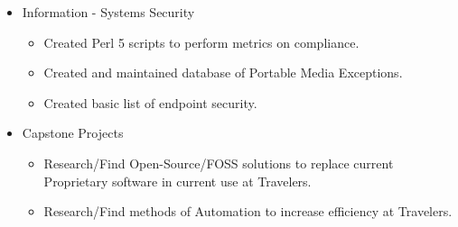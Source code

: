 \begin{cvparagraph}
\begin{itemize}
   \item Information - Systems Security
   \begin{itemize}
      \item Created Perl 5 scripts to perform metrics on compliance.
      \item Created and maintained database of Portable Media Exceptions.
      \item Created basic list of endpoint security.
   \end{itemize}
   
   \item[] \hspace{-0.4cm} Capstone Projects
   \begin{itemize}
      \item Research/Find Open-Source/FOSS solutions to replace current Proprietary
            software in current use at Travelers.
      \item Research/Find methods of Automation to increase efficiency at Travelers.
   \end{itemize}

\end{itemize}

\end{cvparagraph}
